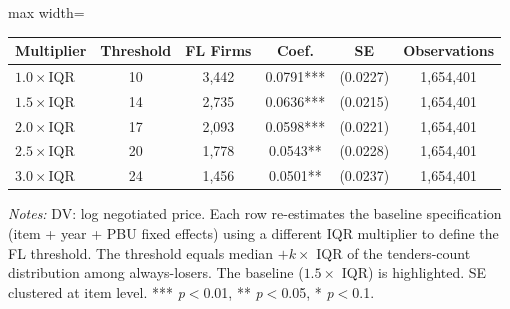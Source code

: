 \begin{adjustbox}{max width=\textwidth}
\begin{threeparttable}
\small
\begin{tabular}{lccccc}
\toprule
Multiplier & Threshold & FL Firms & Coef. & SE & Observations \\
\midrule
$1.0 \times \text{IQR}$ & 10 & 3,442 & 0.0791*** & (0.0227) & 1,654,401 \\
$1.5 \times \text{IQR}$ & 14 & 2,735 & 0.0636*** & (0.0215) & 1,654,401 \\
$2.0 \times \text{IQR}$ & 17 & 2,093 & 0.0598*** & (0.0221) & 1,654,401 \\
$2.5 \times \text{IQR}$ & 20 & 1,778 & 0.0543** & (0.0228) & 1,654,401 \\
$3.0 \times \text{IQR}$ & 24 & 1,456 & 0.0501** & (0.0237) & 1,654,401 \\
\bottomrule
\end{tabular}
\begin{tablenotes}
\small
\item \textit{Notes:} DV: log negotiated price. Each row re-estimates the baseline
specification (item + year + PBU fixed effects) using a different IQR multiplier
to define the FL threshold. The threshold equals median $+ k \times$ IQR of
the tenders-count distribution among always-losers. The baseline ($1.5 \times$
IQR) is highlighted. SE clustered at item level.
*** \textit{p}$<$0.01, ** \textit{p}$<$0.05, * \textit{p}$<$0.1.
\end{tablenotes}
\end{threeparttable}
\end{adjustbox}
